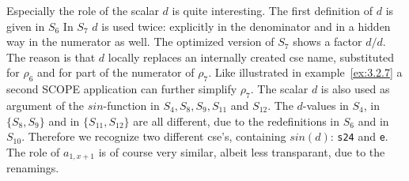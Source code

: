 Especially the role of the scalar $d$ is quite interesting. The first definition
of $d$ is given in $S_6$ In $S_7$ $d$ is used twice: explicitly in the
denominator and in a hidden way in the numerator as well. The optimized
version of $S_7$ shows a factor $d/d$. The reason is that $d$ locally replaces
an internally created cse name, substituted for ${\rho}_6$ and for part of the
numerator of ${\rho}_7$. Like illustrated in example~\ref{ex:3.2.7} a second
SCOPE application can further simplify ${\rho}_7$. The scalar $d$ is also used
as argument of the $sin$-function in $S_4 , S_8 , S_9 , S_{11}$ and $S_{12}$.
The $d$-values in $S_4$, in $\{ S_8 , S_9 \}$ and in $\{ S_{11} , S_{12} \}$
are all different, due to the redefinitions in $S_6$ and in $S_{10}$. Therefore
we recognize two different cse's, containing $sin(d)$: {\tt s24} and {\tt e}.
The role of $a_{1,x+1}$ is of course very similar, albeit less transparant,
due to the renamings.

